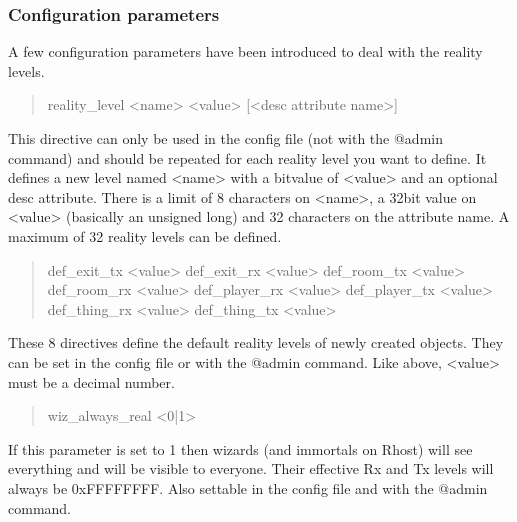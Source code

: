 \documentclass[letterpaper,10pt,english]{sphinxmanual}
\begin{document}
\subsubsection{Configuration parameters}
\label{\detokenize{advanced:configuration-parameters}}
\sphinxAtStartPar
A few configuration parameters have been introduced to deal with the reality
levels.
\begin{quote}

\sphinxAtStartPar
reality\_level \textless{}name\textgreater{} \textless{}value\textgreater{} {[}\textless{}desc attribute name\textgreater{}{]}
\end{quote}

\sphinxAtStartPar
This directive can only be used in the config file (not with the @admin
command) and should be repeated for each reality level you want to define.
It defines a new level named \textless{}name\textgreater{} with a bitvalue of \textless{}value\textgreater{} and an
optional desc attribute. There is a limit of 8 characters on \textless{}name\textgreater{}, a
32\sphinxhyphen{}bit value on \textless{}value\textgreater{} (basically an unsigned long) and 32 characters on
the attribute name. A maximum of 32 reality levels can be defined.
\begin{quote}

\sphinxAtStartPar
def\_exit\_tx \textless{}value\textgreater{}
def\_exit\_rx \textless{}value\textgreater{}
def\_room\_tx \textless{}value\textgreater{}
def\_room\_rx \textless{}value\textgreater{}
def\_player\_rx \textless{}value\textgreater{}
def\_player\_tx \textless{}value\textgreater{}
def\_thing\_rx \textless{}value\textgreater{}
def\_thing\_tx \textless{}value\textgreater{}
\end{quote}

\sphinxAtStartPar
These 8 directives define the default reality levels of newly created
objects. They can be set in the config file or with the @admin command.
Like above, \textless{}value\textgreater{} must be a decimal number.
\begin{quote}

\sphinxAtStartPar
wiz\_always\_real \textless{}0|1\textgreater{}
\end{quote}

\sphinxAtStartPar
If this parameter is set to 1 then wizards (and immortals on Rhost) will see
everything and will be visible to everyone. Their effective Rx and Tx levels
will always be 0xFFFFFFFF. Also settable in the config file and with the
@admin command.
\end{document}
